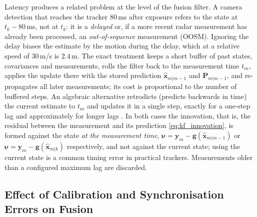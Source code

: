 Latency produces a related problem at the level of the fusion filter. A camera detection that reaches the tracker $80$\,ms after exposure refers to the state at $t_{k}-80$\,ms, not at $t_{k}$: it is a \emph{delayed} or, if a more recent radar measurement has already been processed, an \emph{out-of-sequence} measurement (OOSM). Ignoring the delay biases the estimate by the motion during the delay, which at a relative speed of $30$\,m/s is $2.4$\,m. The exact treatment keeps a short buffer of past states, covariances and measurements, rolls the filter back to the measurement time $t_{m}$, applies the update there with the stored prediction $\widehat{\mathbf{x}}_{m|m-1}$ and $\mathbf{P}_{m|m-1}$, and re-propagates all later measurements; its cost is proportional to the number of buffered steps. An algebraic alternative retrodicts (predicts backwards in time) the current estimate to $t_{m}$ and updates it in a single step, exactly for a one-step lag and approximately for longer lags \cite{barshalom2002_oosm,barshalom2001_estimation}. In both cases the innovation, that is, the residual between the measurement and its prediction \eqref{eq:kf_innovation}, is formed against the state \emph{at the measurement time}, $\boldsymbol{\nu}=\mathbf{y}_{m}-\mathbf{g}(\widehat{\mathbf{x}}_{m|m-1})$ or $\boldsymbol{\nu}=\mathbf{y}_{m}-\mathbf{g}(\widehat{\mathbf{x}}_{m|k})$ respectively, and not against the current state; using the current state is a common timing error in practical trackers. Measurements older than a configured maximum lag are discarded.

\subsection{Effect of Calibration and Synchronisation Errors on Fusion}
\label{subsec:calibration-errors}

